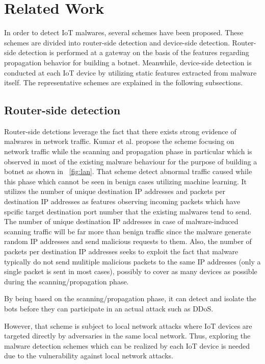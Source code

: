 \chapter{Related Work}\label{sec:related_work} 
In order to detect IoT malwares, several schemes have been proposed. 
These schemes are divided into router-side detection and device-side detection.
Router-side detection is performed at a gateway on the basis of the features regarding propagation behavior for building a botnet.
Meanwhile, device-side detection is conducted at each IoT device by utilizing static features extracted from malware itself.
The representative schemes are explained in the following subsections.

\section{Router-side detection}
Router-side detctions leverage the fact that there exists strong evidence of malwares in network traffic.
Kumar et al. \cite{net} propose the scheme focusing on network traffic while the scanning and propagation phase in particular which is observed in most of the existing malware behaviour for the purpose of building a botnet as shown in \figurename~\ref{fig:lan}. 
That scheme detect abnormal traffic caused while this phase which cannot be seen in benign cases utilizing machine learning.
It utilizes the number of unique destination IP addresses and packets per destination IP addresses as features observing incoming packets which have spcific target destination port number that the existing malwares tend to send.
The number of unique destination IP addresses in case of malware-induced scanning traffic will be far more than benign traffic since the malware generate random IP addresses and send malicious requests to them.
Also, the number of packets per destination IP addresses seeks to exploit the fact that malware typically do not send mulitiple malicious packets to the same IP addresses (only a single packet is sent in most cases), possibly to cover as many devices as possible during the scanning/propagation phase.

By being based on the scanning/propagation phase, it can detect and isolate the bots before they can participate in an actual attack such as DDoS.

However, that scheme is subject to local network attacks where IoT devices are targeted directly by adversaries in the same local network.
Thus, exploring the malware detection schemes which can be realized by each IoT device is needed due to the vulnerability against local network attacks.

